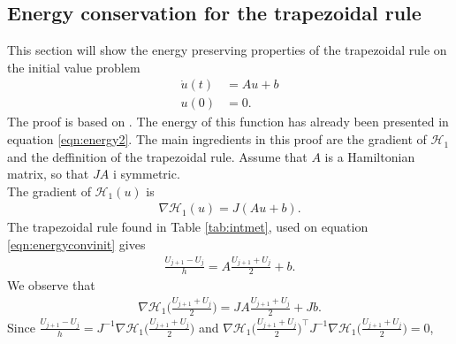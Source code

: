 \subsection{Energy conservation for the trapezoidal rule} %
This section will show the energy preserving properties of the trapezoidal rule on the initial value problem
\begin{equation}
\begin{aligned}
\dot{u}(t)& = Au + b \\
u(0)& = 0.
\end{aligned}
\label{eqn:energyconvinit}
\end{equation}
\noindent The proof is based on \cite{convtrap}.
The energy of this function has already been presented in equation \eqref{eqn:energy2}. The main ingredients in this proof are the gradient of $\mathcal{H}_1$ and the deffinition of the trapezoidal rule. Assume that $A$ is a Hamiltonian matrix, so that $JA$ i symmetric.\\ 
The gradient of $\mathcal{H}_1(u)$ is 
\begin{equation*}
\begin{aligned}
\nabla \mathcal{H}_1(u) = J (Au + b) .
\end{aligned}
\end{equation*}
\noindent The trapezoidal rule found in Table \ref{tab:intmet}, used on equation \eqref{eqn:energyconvinit} gives 
\begin{equation*}
\begin{aligned}
\frac{U_{j+1} - U_j}{h} = A \frac{U_{j+1}  + U_j}{2} + b.
\end{aligned}
\end{equation*}
\noindent We observe that
\begin{equation*}
\begin{aligned}
\nabla \mathcal{H}_1 \Big(\frac{U_{j+1}  + U_j}{2}\Big) = JA \frac{U_{j+1}  + U_j}{2} + J b.
\end{aligned}
\end{equation*}
\noindent Since
$\frac{ U_{j+1} - U_j}{h} = J^{-1} \nabla \mathcal{H}_1 \Big( \frac{U_{j+1}  + U_j}{2} \Big) $
\noindent and
$\nabla \mathcal{H}_1 \Big( \frac{U_{j+1}  + U_j}{2} \Big)^\top J^{-1} \nabla \mathcal{H}_1  \Big( \frac{U_{j+1}  + U_j}{2}\Big) = 0$,
